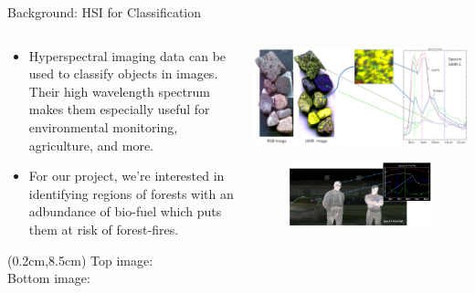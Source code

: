 \documentclass[aspectratio=169,xcolor=dvipsnames]{beamer}
\begin{document}
\begin{frame}{Background: HSI for Classification}
    \begin{columns}
        \begin{column}{0.53\textwidth}
            \begin{itemize}
                \item Hyperspectral imaging data can be used to classify objects in images. Their high wavelength spectrum makes them especially useful for environmental monitoring, agriculture, and more.
                \item For our project, we're interested in identifying regions of forests with an adbundance of bio-fuel which puts them at risk of forest-fires.
            \end{itemize}


            \begin{textblock*}{5cm}(0.2cm,8.5cm)
                \tiny Top image: \cite{hsi-stones} \\ Bottom image: \cite{hsi-people}
            \end{textblock*}


        \end{column}
        \begin{column}{0.43\textwidth}
            \includegraphics[width=\textwidth]{wiki_hsi2.png}
            \begin{figure}
                \centering
                \includegraphics[width=\textwidth]{wiki_hsi1.png}
            \end{figure}
        \end{column}
    \end{columns}
\end{frame}
    
\end{document}

